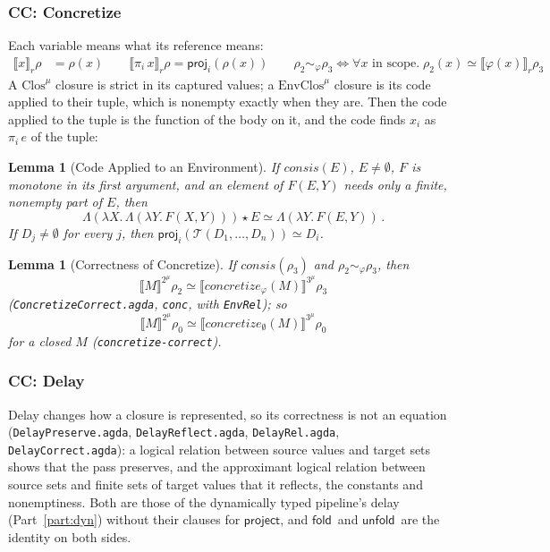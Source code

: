 \documentclass[10pt]{article}
\theoremstyle{acmplain}
\newtheorem{lemma}[theorem]{Lemma}
\newcommand{\SEM}[1]{\llbracket #1 \rrbracket}
\newcommand{\key}[1]{\mathsf{#1}}
\newcommand{\pass}[1]{\mathit{#1}}
\newcommand{\prj}[1]{\pi_{#1}\,}
\newcommand{\app}{\star}
\newcommand{\NE}{\neq\emptyset}
\newcommand{\consis}{\mathit{consis}}
\newcommand{\Ml}[1]{\textrm{#1}^{\mu}}                  %
\newcommand{\Mfold}{\key{fold}\,}
\newcommand{\Munfold}{\key{unfold}\,}
\begin{document}
\subsubsection{CC: Concretize}

Each variable means what its reference means:
\begin{align*}
  \SEM{x}_r\rho &= \rho(x) \qquad
  \SEM{\prj{i} x}_r\rho = \key{proj}_i(\rho(x)) \qquad
  \rho_2 \sim_\varphi \rho_3 \iff \forall x \text{ in scope}.\; \rho_2(x) \simeq \SEM{\varphi(x)}_r\rho_3
\end{align*}
A $\Ml{Clos}$ closure is strict in its captured values; a $\Ml{EnvClos}$
closure is its code applied to their tuple, which is nonempty exactly
when they are. Then the code applied to the tuple is the function of the
body on it, and the code finds $x_i$ as $\prj{i} e$ of the tuple:
\begin{lemma}[Code Applied to an Environment]\label{lem:m-den-code-env}
If $\consis(E)$, $E \NE$, $F$ is monotone in its first argument, and an
element of $F(E, Y)$ needs only a finite, nonempty part of $E$, then
\[ \Lambda(\lambda X.\, \Lambda(\lambda Y.\, F(X, Y))) \app E \simeq \Lambda(\lambda Y.\, F(E, Y))\,. \]
If $D_j \NE$ for every $j$, then $\key{proj}_i(\mathcal{T}(D_1, \ldots, D_n)) \simeq D_i$.
\end{lemma}
\begin{lemma}[Correctness of Concretize]\label{lem:m-den-concretize}
If $\consis(\rho_3)$ and $\rho_2 \sim_\varphi \rho_3$, then
\[ \SEM{M}^{\Ml{2}}\rho_2 \simeq \SEM{\pass{concretize}_\varphi(M)}^{\Ml{3}}\rho_3 \]
(\texttt{ConcretizeCorrect.agda}, \texttt{conc}, with \texttt{EnvRel}); so
\[ \SEM{M}^{\Ml{2}}\rho_0 \simeq \SEM{\pass{concretize}_\emptyset(M)}^{\Ml{3}}\rho_0 \]
for a closed $M$ (\texttt{concretize-correct}).
\end{lemma}

\subsubsection{CC: Delay}\label{sec:m-den-delay}

Delay changes how a closure is represented, so its correctness is not an
equation (\texttt{DelayPreserve.agda}, \texttt{DelayReflect.agda},
\texttt{DelayRel.agda}, \texttt{DelayCorrect.agda}): a logical relation
between source values and target sets shows that the pass preserves, and
the approximant logical relation between source sets and finite sets of
target values that it reflects, the constants and nonemptiness. Both are
those of the dynamically typed pipeline's delay (Part~\ref{part:dyn})
without their clauses for $\key{project}$, and $\Mfold$ and $\Munfold$ are
the identity on both sides.
\end{document}
